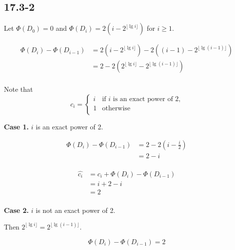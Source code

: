 \subsection*{17.3-2}

Let $\Phi(D_0) = 0$ and $\Phi(D_i) = 2(i - 2^{\lfloor \lg i \rfloor})$
for $i \geq 1$.

\begin{equation*}
\begin{split}
    \Phi(D_i) - \Phi(D_{i - 1}) 
    & = 2(i - 2^{\lfloor \lg i \rfloor}) - 2((i - 1) - 2^{\lfloor \lg (i - 1) \rfloor}) \\
    & = 2 - 2(2^{\lfloor \lg i \rfloor} - 2^{\lfloor \lg (i - 1) \rfloor}) \\
\end{split}
\end{equation*}

Note that
\begin{equation*}
    c_i = 
    \begin{cases}
        i & \text{if $i$ is an exact power of 2,} \\
        1 & \text{otherwise} \\
    \end{cases}
\end{equation*}

\textbf{Case 1.}
$i$ is an exact power of 2.

\begin{equation*}
\begin{split}
    \Phi(D_i) - \Phi(D_{i - 1}) 
    & = 2 - 2(i - \frac{i}{2}) \\
    & = 2 - i \\
\end{split}
\end{equation*}

\begin{equation*}
\begin{split}
    \hat{c_i} & = c_i + \Phi(D_i) - \Phi(D_{i - 1}) \\
    & = i + 2 - i \\
    & = 2 \\
\end{split}
\end{equation*}

\textbf{Case 2.}
$i$ is not an exact power of 2.

Then $2^{\lfloor \lg i \rfloor} = 2^{\lfloor \lg (i - 1) \rfloor}$.

\begin{equation*}
    \Phi(D_i) - \Phi(D_{i - 1}) = 2
\end{equation*}

